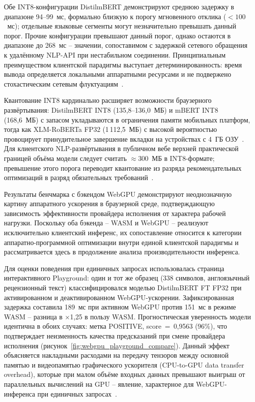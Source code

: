 Обе INT8-конфигурации DistilmBERT демонстрируют среднюю задержку в диапазоне 94–99~мс, формально близкую к порогу мгновенного отклика ($< 100$~мс); отдельные языковые сегменты могут незначительно превышать данный порог. Прочие конфигурации превышают данный порог, однако остаются в диапазоне до 268~мс – значении, сопоставимом с задержкой сетевого обращения к удалённому NLP-API при нестабильном соединении. Принципиальным преимуществом клиентской парадигмы выступает детерминированность: время вывода определяется локальными аппаратными ресурсами и не подвержено стохастическим сетевым флуктуациям~\cite{xu2024ondevice}.

Квантование INT8 кардинально расширяет возможности браузерного развёртывания: DistilmBERT INT8 (135{,}8–136{,}0~МБ) и mBERT INT8 (168{,}6~МБ) с запасом укладываются в ограничения памяти мобильных платформ, тогда как XLM-RoBERTa FP32 (1\,112{,}5~МБ) с высокой вероятностью провоцирует принудительное завершение вкладки на устройствах с 4~ГБ ОЗУ~\cite{husom2025sustainable}. Для клиентского NLP-развёртывания в публичном вебе верхней практической границей объёма модели следует считать $\approx$300~МБ в INT8-формате; превышение этого порога переводит квантование из разряда рекомендательных оптимизаций в разряд обязательных требований~\cite{xu2024ondevice, husom2025sustainable}.

Результаты бенчмарка с бэкендом WebGPU демонстрируют неоднозначную картину аппаратного ускорения в браузерной среде, подтверждающую зависимость эффективности провайдера исполнения от характера рабочей нагрузки. Поскольку оба бэкенда – WASM и WebGPU – реализуют исключительно клиентский инференс, их сопоставление относится к категории аппаратно-программной оптимизации внутри единой клиентской парадигмы и рассматривается здесь в продолжение анализа производительности инференса.

Для оценки поведения при единичных запросах использовалась страница интерактивного Playground: один и тот же образец (338 символов, англоязычный рецензионный текст) классифицировался моделью DistilmBERT FT FP32 при активированном и деактивированном WebGPU-ускорении. Зафиксированная задержка составила 189~мс при активном WebGPU против 151~мс в режиме WASM – разница в $\times$1{,}25 в пользу WASM. Прогностическая уверенность модели идентична в обоих случаях: метка POSITIVE, score~=~0{,}9563 (96\%), что подтверждает неизменность качества предсказаний при смене провайдера исполнения (рисунок~\ref{fig:webgpu_playground_compare}). Данный эффект объясняется накладными расходами на передачу тензоров между основной памятью и видеопамятью графического ускорителя (CPU-to-GPU data transfer overhead), которые при малом объёме входных данных превышают выигрыш от параллельных вычислений на GPU – явление, характерное для WebGPU-инференса при единичных запросах~\cite{jia2024empowering}.

